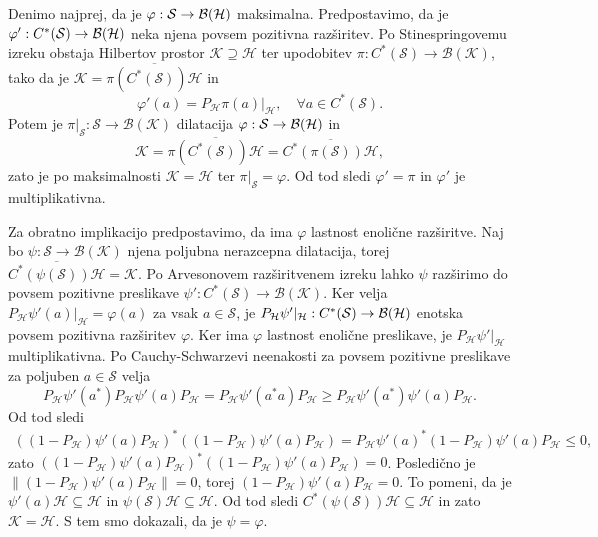 \begin{dokaz}
    Denimo najprej, da je $\varphi: \mathcal{S} \to \operatorname{\mathcal{B} (\mathcal{H})}$ maksimalna.
    Predpostavimo, da je $\varphi': C^* (\mathcal{S}) \to \operatorname{\mathcal{B} (\mathcal{H})}$ neka njena povsem pozitivna razširitev.
    Po Stinespringovemu izreku obstaja Hilbertov prostor $\mathcal{K} \supseteq \mathcal{H}$ ter upodobitev $\pi: C^* (\mathcal{S}) \to \mathcal{B}(\mathcal{K})$, tako da je 
    $\mathcal{K} = \overline{\pi (C^* (\mathcal{S})) \mathcal{H}}$ in
    $$\varphi' (a) = P_{\mathcal{H}} \pi (a) |_{\mathcal{H}},\quad \forall a \in C^* (\mathcal{S}).$$ 
    Potem je $\pi |_{\mathcal{S}}: \mathcal{S} \to \mathcal{B}(\mathcal{K})$ dilatacija 
    $\varphi: \mathcal{S} \to \operatorname{\mathcal{B} (\mathcal{H})}$ in 
    $$\mathcal{K} = \overline{\pi (C^* (\mathcal{S})) \mathcal{H}} = \overline{C^*( \pi (\mathcal{S})) \mathcal{H}},$$
    zato je po maksimalnosti $\mathcal{K} = \mathcal{H}$ ter $\pi|_{\mathcal{S}} =  \varphi$.
    Od tod sledi $\varphi' = \pi$ in $\varphi'$ je multiplikativna.
    
    Za obratno implikacijo predpostavimo, da ima 
    $\varphi$ lastnost enolične razširitve. Naj bo $\psi : \mathcal{S} \to \mathcal{B}(\mathcal{K})$ njena poljubna nerazcepna dilatacija, torej 
    $\overline{C^* (\psi(\mathcal{S})) \mathcal{H}} = \mathcal{K}$.
    Po Arvesonovem razširitvenem izreku lahko $\psi$ razširimo do povsem pozitivne preslikave 
    $\psi': C^* (\mathcal{S}) \to \mathcal{B}(\mathcal{K})$. Ker velja 
    $P_\mathcal{H} \psi' (a) |_{\mathcal{H}} = \varphi(a)$ za vsak $a \in \mathcal{S}$,
    je $P_\mathcal{H} \psi' |_{\mathcal{H}}: C^*(\mathcal{S}) \to \operatorname{\mathcal{B} (\mathcal{H})}$ enotska povsem pozitivna razširitev $\varphi$.
    Ker ima $\varphi$ lastnost enolične preslikave, je $P_\mathcal{H} \psi' |_{\mathcal{H}}$ multiplikativna.
    Po Cauchy-Schwarzevi neenakosti za povsem pozitivne preslikave za poljuben 
    $a \in \mathcal{S}$ velja 
    $$P_{\mathcal{H}} \psi' (a^*) P_{\mathcal{H}} \psi' (a) P_{\mathcal{H}} = P_{\mathcal{H}} \psi' (a^* a) P_{\mathcal{H}} \geq P_{\mathcal{H}} \psi' (a^*) \psi' (a) P_{\mathcal{H}}.$$
    Od tod sledi 
    \begin{align*}
        ((1 - P_{\mathcal{H}}) \psi'(a) P_{\mathcal{H}})^* ((1 - P_{\mathcal{H}}) \psi'(a) P_{\mathcal{H}}) = P_{\mathcal{H}} \psi'(a)^* (1 - P_{\mathcal{H}}) \psi'(a) P_{\mathcal{H}} \leq 0,
    \end{align*}
    zato $((1 - P_{\mathcal{H}}) \psi'(a) P_{\mathcal{H}})^* ((1 - P_{\mathcal{H}}) \psi'(a) P_{\mathcal{H}}) = 0$.
    Posledično je $\| (1 - P_{\mathcal{H}}) \psi'(a) P_{\mathcal{H}}\| = 0$, torej 
    $(1 - P_{\mathcal{H}}) \psi'(a) P_{\mathcal{H}}= 0$. To pomeni, da je $\psi' (a) \mathcal{H} \subseteq \mathcal{H}$ 
    in $\psi (\mathcal{S}) \mathcal{H} \subseteq \mathcal{H}$.
    Od tod sledi $C^* (\psi (\mathcal{S})) \mathcal{H} \subseteq \mathcal{H}$ in zato $\mathcal{K} = \mathcal{H}$. S tem smo dokazali, da je $\psi = \varphi$.
\end{dokaz}

